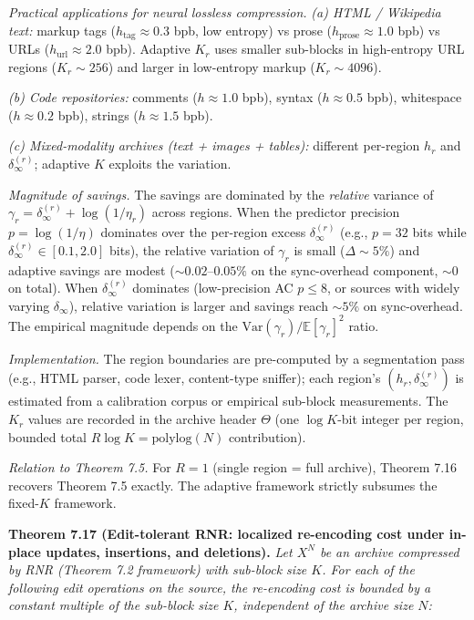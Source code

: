 \documentclass[
]{article}
\begin{document}
\emph{Practical applications for neural lossless compression.}
\emph{(a) HTML / Wikipedia text: } markup tags ($h_{\text{tag}} \approx
0.3$ bpb, low entropy) vs prose ($h_{\text{prose}} \approx 1.0$ bpb)
vs URLs ($h_{\text{url}} \approx 2.0$ bpb). Adaptive $K_r$ uses smaller
sub-blocks in high-entropy URL regions ($K_r \sim 256$) and larger in
low-entropy markup ($K_r \sim 4096$).

\emph{(b) Code repositories: } comments ($h \approx 1.0$ bpb), syntax
($h \approx 0.5$ bpb), whitespace ($h \approx 0.2$ bpb), strings
($h \approx 1.5$ bpb).

\emph{(c) Mixed-modality archives (text + images + tables):} different
per-region $h_r$ and $\delta_\infty^{(r)}$; adaptive $K$ exploits the
variation.

\emph{Magnitude of savings.} The savings are dominated by the
\emph{relative} variance of $\gamma_r = \delta_\infty^{(r)} +
\log(1/\eta_r)$ across regions. When the predictor precision $p =
\log(1/\eta)$ dominates over the per-region excess
$\delta_\infty^{(r)}$ (e.g., $p = 32$ bits while
$\delta_\infty^{(r)} \in [0.1, 2.0]$ bits), the relative variation of
$\gamma_r$ is small ($\Delta \sim 5\%$) and adaptive savings are
modest ($\sim 0.02$--$0.05\%$ on the sync-overhead component, $\sim 0$
on total). When $\delta_\infty^{(r)}$ dominates (low-precision AC
$p \leq 8$, or sources with widely varying $\delta_\infty$),
relative variation is larger and savings reach $\sim 5\%$ on
sync-overhead. The empirical magnitude depends on the
$\mathrm{Var}(\gamma_r) / \mathbb{E}[\gamma_r]^2$ ratio.

\emph{Implementation.} The region boundaries are pre-computed by a
segmentation pass (e.g., HTML parser, code lexer, content-type
sniffer); each region's $(h_r, \delta_\infty^{(r)})$ is estimated
from a calibration corpus or empirical sub-block measurements. The
$K_r$ values are recorded in the archive header $\Theta$ (one
$\log K$-bit integer per region, bounded total $R \log K = \mathrm{polylog}(N)$
contribution).

\emph{Relation to Theorem 7.5.} For $R = 1$ (single region = full
archive), Theorem 7.16 recovers Theorem 7.5 exactly. The adaptive
framework strictly subsumes the fixed-$K$ framework.

\textbf{Theorem 7.17 (Edit-tolerant RNR: localized re-encoding cost
under in-place updates, insertions, and deletions).}
\emph{Let $X^N$ be an archive compressed by RNR (Theorem 7.2 framework)
with sub-block size $K$. For each of the following edit operations on
the source, the re-encoding cost is bounded by a constant multiple of
the sub-block size $K$, independent of the archive size $N$:}
\end{document}
